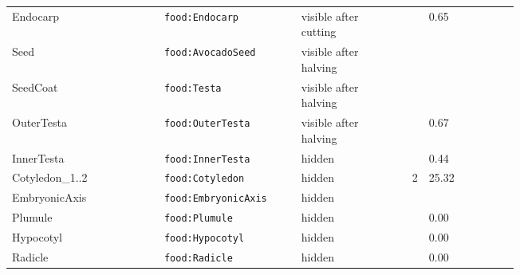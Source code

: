 \documentclass[10.5pt,a4paper]{article}
\begin{document}
\begin{table}[htbp]
\begin{tabularx}{\linewidth}{@{}p{0.30\linewidth}p{0.27\linewidth}p{0.17\linewidth}rX@{}}
\hspace*{0.0em}Endocarp & \texttt{food:Endocarp} & visible after cutting &  & 0.65 \\
\hspace*{0.0em}Seed & \texttt{food:AvocadoSeed} & visible after halving &  &  \\
\hspace*{0.9em}SeedCoat & \texttt{food:Testa} & visible after halving &  &  \\
\hspace*{1.8em}OuterTesta & \texttt{food:OuterTesta} & visible after halving &  & 0.67 \\
\hspace*{1.8em}InnerTesta & \texttt{food:InnerTesta} & hidden &  & 0.44 \\
\hspace*{0.9em}Cotyledon\_1..2 & \texttt{food:Cotyledon} & hidden & 2 & 25.32 \\
\hspace*{0.9em}EmbryonicAxis & \texttt{food:EmbryonicAxis} & hidden &  &  \\
\hspace*{1.8em}Plumule & \texttt{food:Plumule} & hidden &  & 0.00 \\
\hspace*{1.8em}Hypocotyl & \texttt{food:Hypocotyl} & hidden &  & 0.00 \\
\hspace*{1.8em}Radicle & \texttt{food:Radicle} & hidden &  & 0.00 \\\bottomrule\end{tabularx}\end{table}
\end{document}
